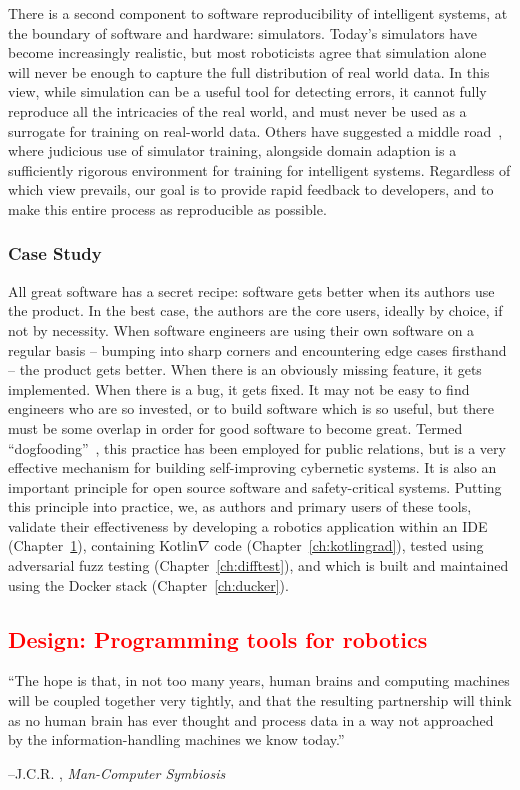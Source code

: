 \documentclass[12pt,initial,twoside,maitrise]{dms}
\newcommand{\rare}[1]{\textcolor{red}{#1}}
\numberwithin{equation}{section}
\numberwithin{table}{chapter}
\numberwithin{figure}{chapter}
\begin{document}
There is a second component to software reproducibility of intelligent systems, at the boundary of software and hardware: simulators. Today's simulators have become increasingly realistic, but most roboticists agree that simulation alone will never be enough to capture the full distribution of real world data. In this view, while simulation can be a useful tool for detecting errors, it cannot fully reproduce all the intricacies of the real world, and must never be used as a surrogate for training on real-world data. Others have suggested a middle road~\citep{bousmalis2018using}, where judicious use of simulator training, alongside domain adaption is a sufficiently rigorous environment for training for intelligent systems. Regardless of which view prevails, our goal is to provide rapid feedback to developers, and to make this entire process as reproducible as possible.

\subsection{Case Study}\label{subsec:case-study}

All great software has a secret recipe: software gets better when its authors use the product. In the best case, the authors are the core users, ideally by choice, if not by necessity. When software engineers are using their own software on a regular basis -- bumping into sharp corners and encountering edge cases firsthand -- the product gets better. When there is an obviously missing feature, it gets implemented. When there is a bug, it gets fixed. It may not be easy to find engineers who are so invested, or to build software which is so useful, but there must be some overlap in order for good software to become great. Termed ``dogfooding''~\citep{harrison2006eating}, this practice has been employed for public relations, but is a very effective mechanism for building self-improving cybernetic systems. It is also an important principle for open source software and safety-critical systems. Putting this principle into practice, we, as authors and primary users of these tools, validate their effectiveness by developing a robotics application within an IDE (Chapter~\ref{ch:hatchery}), containing Kotlin$\nabla$ code (Chapter~\ref{ch:kotlingrad}), tested using adversarial fuzz testing (Chapter~\ref{ch:difftest}), and which is built and maintained using the Docker stack (Chapter~\ref{ch:ducker}).

\rare{\chapter{Design: Programming tools for robotics}\label{ch:hatchery}}
\setlength{\epigraphwidth}{0.78\textwidth}
\epigraph{``The hope is that, in not too many years, human brains and computing machines will be coupled together very tightly, and that the resulting partnership will think as no human brain has ever thought and process data in a way not approached by the information-handling machines we know today.''}{\begin{flushright}--J.C.R. \citet{licklider1960man}, \textit{Man-Computer Symbiosis}\end{flushright}}
\end{document}
